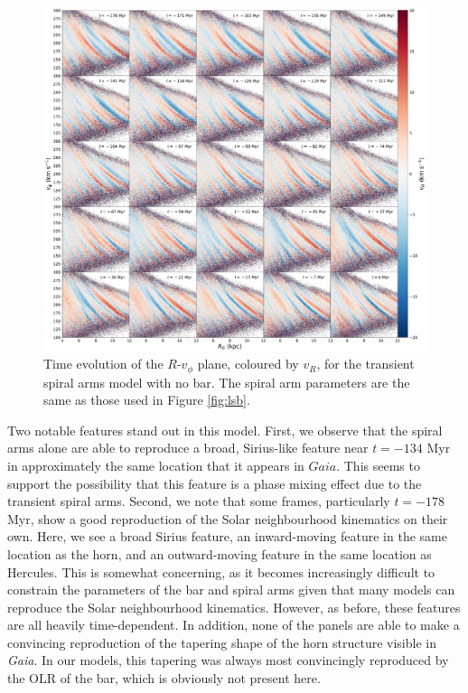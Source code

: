 \documentclass[10pt]{article}
\begin{document}
\begin{figure}[h]
    \centering
    \includegraphics[width=\textwidth]{plots/three_spirals_no_bar_RvT_vR.pdf}
    \caption{Time evolution of the $R$-$v_\phi$ plane, coloured by $v_R$, for the transient spiral arms model with no bar. The spiral arm parameters are the same as those used in Figure \ref{fig:lsb}.}
    \label{fig:no-bar}
\end{figure}

Two notable features stand out in this model. First, we observe that the spiral arms alone are able to reproduce a broad, Sirius-like feature near $t = -134$ Myr in approximately the same location that it appears in $\textit{Gaia}$. This seems to support the possibility that this feature is a phase mixing effect due to the transient spiral arms. Second, we note that some frames, particularly $t = -178$ Myr, show a good reproduction of the Solar neighbourhood kinematics on their own. Here, we see a broad Sirius feature, an inward-moving feature in the same location as the horn, and an outward-moving feature in the same location as Hercules. This is somewhat concerning, as it becomes increasingly difficult to constrain the parameters of the bar and spiral arms given that many models can reproduce the Solar neighbourhood kinematics. However, as before, these features are all heavily time-dependent. In addition, none of the panels are able to make a convincing reproduction of the tapering shape of the horn structure visible in \textit{Gaia}. In our models, this tapering was always most convincingly reproduced by the OLR of the bar, which is obviously not present here.
\end{document}
